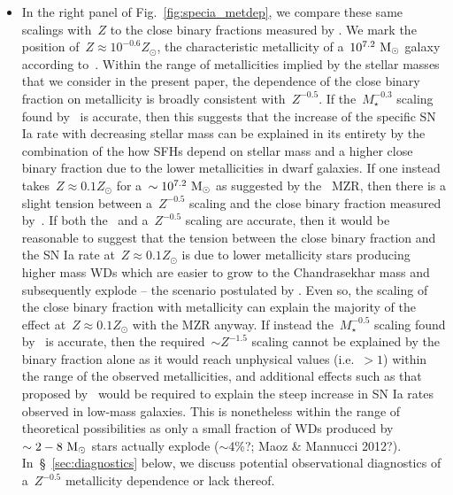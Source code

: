 \documentclass[ms.tex]{subfiles}
\begin{document}
\begin{itemize}
	\item In the right panel of Fig.~\ref{fig:specia_metdep}, we compare these
	same scalings with~$Z$ to the close binary fractions measured by
	\citet{Moe2019}.
	We mark the position of~$Z \approx 10^{-0.6} Z_\odot$, the characteristic
	metallicity of a~$10^{7.2}~\text{M}_\odot$ galaxy according to~\citet{Zahid2014}.
	Within the range of metallicities implied by the stellar masses that we
	consider in the present paper, the dependence of the close binary fraction
	on metallicity is broadly consistent with~$Z^{-0.5}$.
	If the~$M_\star^{-0.3}$ scaling found by~\citet{Gandhi2022} is accurate,
	then this suggests that the increase of the specific SN Ia rate with
	decreasing stellar mass can be explained in its entirety by the combination
	of the how SFHs depend on stellar mass and a higher close binary fraction
	due to the lower metallicities in dwarf galaxies.
	If one instead takes~$Z \approx 0.1 Z_\odot$ for a~$\sim10^{7.2}~\text{M}_\odot$
	as suggested by the~\citet{Andrews2013} MZR, then there is a slight
	tension between a~$Z^{-0.5}$ scaling and the close binary fraction measured
	by~\citet{Moe2019}.
	If both the~\citet{Andrews2013} and a~$Z^{-0.5}$ scaling are accurate, then
	it would be reasonable to suggest that the tension between the close binary
	fraction and the SN Ia rate at~$Z \approx 0.1 Z_\odot$ is due to lower
	metallicity stars producing higher mass WDs which are easier to grow to the
	Chandrasekhar mass and subsequently explode -- the scenario postulated by
	\citet{Kistler2013}.
	Even so, the scaling of the close binary fraction with metallicity can
	explain the majority of the effect at~$Z \approx 0.1 Z_\odot$ with the
	\citet{Andrews2013} MZR anyway.
	If instead the~$M_\star^{-0.5}$ scaling found by~\citet{Brown2019} is
	accurate, then the required~$\sim Z^{-1.5}$ scaling cannot be explained by
	the binary fraction alone as it would reach unphysical values (i.e.~$>1$)
	within the range of the observed metallicities, and additional effects
	such as that proposed by~\citet{Kistler2013} would be required to explain
	the steep increase in SN Ia rates observed in low-mass galaxies.
	This is nonetheless within the range of theoretical possibilities as only a
	small fraction of WDs produced by~$\sim2-8~\text{M}_\odot$ stars actually explode
	{\color{red} ($\sim$4\%?; Maoz \& Mannucci 2012?)}.
	In~\S~\ref{sec:diagnostics} below, we discuss potential observational
	diagnostics of a~$Z^{-0.5}$ metallicity dependence or lack thereof.


\end{itemize}
\end{document}
